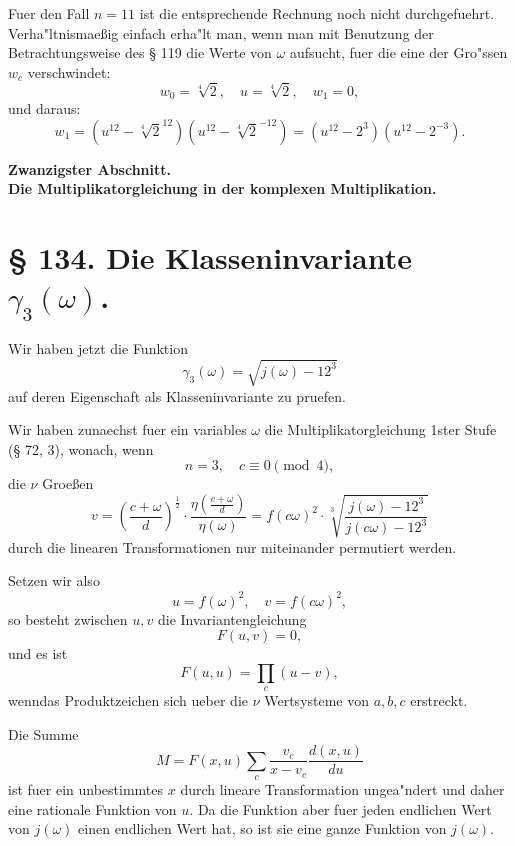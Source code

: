 \documentclass[12pt,a4paper]{article}
\theoremstyle{plain}
\theoremstyle{definition}
\theoremstyle{remark}
\begin{document}
Fuer den Fall $n = 11$ ist die entsprechende Rechnung noch nicht durchgefuehrt. Verha"ltnismae\ss{}ig einfach erha"lt man, wenn man mit Benutzung der Betrachtungsweise des \S{} 119 die Werte von $\omega$ aufsucht, fuer die eine der Gro"ssen $w_c$ verschwindet:
\[
w_0 = \sqrt[4]{2}, \quad u = \sqrt[4]{2}, \quad w_1 = 0,
\]
und daraus:
\[
w_1 = (u^{12} - \sqrt[4]{2}^{12})(u^{12} - \sqrt[4]{2}^{-12}) = (u^{12} - 2^3)(u^{12} - 2^{-3}).
\]

\newpage

\noindent\textbf{Zwanzigster Abschnitt.}
\\
\textbf{Die Multiplikatorgleichung in der komplexen Multiplikation.}

\section*{\S{} 134. Die Klasseninvariante $\gamma_3(\omega)$.}

Wir haben jetzt die Funktion
\[
\gamma_3(\omega) = \sqrt{j(\omega) - 12^3}
\]
auf deren Eigenschaft als Klasseninvariante zu pruefen.

Wir haben zunaechst fuer ein variables $\omega$ die Multiplikatorgleichung 1ster Stufe (\S{} 72, 3), wonach, wenn
\begin{equation}\label{eq:134_1}
n = 3, \quad c \equiv 0 \pmod{4},
\end{equation}
die $\nu$ Groe\ss{}en
\begin{equation}\label{eq:134_2}
v = \left(\frac{c + \omega}{d}\right)^{\frac{1}{2}} \cdot \frac{\eta\left(\frac{c + \omega}{d}\right)}{\eta(\omega)} = f(c\omega)^2 \cdot \sqrt[3]{\frac{j(\omega) - 12^3}{j(c\omega) - 12^3}}
\end{equation}
durch die linearen Transformationen nur miteinander permutiert werden.

Setzen wir also
\[
u = f(\omega)^2, \quad v = f(c\omega)^2,
\]
so besteht zwischen $u, v$ die Invariantengleichung
\begin{equation}\label{eq:134_3}
F(u, v) = 0,
\end{equation}
und es ist
\[
F(u, u) = \prod_{c} (u - v),
\]
wenndas Produktzeichen sich ueber die $\nu$ Wertsysteme von $a, b, c$ erstreckt.

Die Summe
\begin{equation}\label{eq:134_5}
M = F(x, u) \sum_{c} \frac{v_c}{x - v_c} \frac{d(x, u)}{du}
\end{equation}
ist fuer ein unbestimmtes $x$ durch lineare Transformation ungea"ndert und daher eine rationale Funktion von $u$. Da die Funktion aber fuer jeden endlichen Wert von $j(\omega)$ einen endlichen Wert hat, so ist sie eine ganze Funktion von $j(\omega)$.
\end{document}
